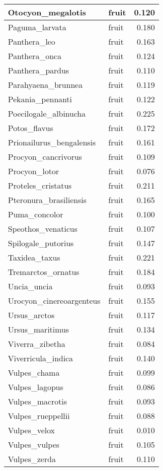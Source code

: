 \begin{table}
\begin{tabular}[t]{l|l|r}
\hline
Otocyon\_megalotis & fruit & 0.120\\
\hline
Paguma\_larvata & fruit & 0.180\\
\hline
Panthera\_leo & fruit & 0.163\\
\hline
Panthera\_onca & fruit & 0.124\\
\hline
Panthera\_pardus & fruit & 0.110\\
\hline
Parahyaena\_brunnea & fruit & 0.119\\
\hline
Pekania\_pennanti & fruit & 0.122\\
\hline
Poecilogale\_albinucha & fruit & 0.225\\
\hline
Potos\_flavus & fruit & 0.172\\
\hline
Prionailurus\_bengalensis & fruit & 0.161\\
\hline
Procyon\_cancrivorus & fruit & 0.109\\
\hline
Procyon\_lotor & fruit & 0.076\\
\hline
Proteles\_cristatus & fruit & 0.211\\
\hline
Pteronura\_brasiliensis & fruit & 0.165\\
\hline
Puma\_concolor & fruit & 0.100\\
\hline
Speothos\_venaticus & fruit & 0.107\\
\hline
Spilogale\_putorius & fruit & 0.147\\
\hline
Taxidea\_taxus & fruit & 0.221\\
\hline
Tremarctos\_ornatus & fruit & 0.184\\
\hline
Uncia\_uncia & fruit & 0.093\\
\hline
Urocyon\_cinereoargenteus & fruit & 0.155\\
\hline
Ursus\_arctos & fruit & 0.117\\
\hline
Ursus\_maritimus & fruit & 0.134\\
\hline
Viverra\_zibetha & fruit & 0.084\\
\hline
Viverricula\_indica & fruit & 0.140\\
\hline
Vulpes\_chama & fruit & 0.099\\
\hline
Vulpes\_lagopus & fruit & 0.086\\
\hline
Vulpes\_macrotis & fruit & 0.093\\
\hline
Vulpes\_rueppellii & fruit & 0.088\\
\hline
Vulpes\_velox & fruit & 0.010\\
\hline
Vulpes\_vulpes & fruit & 0.105\\
\hline
Vulpes\_zerda & fruit & 0.110\\

\end{tabular}
\end{table}
